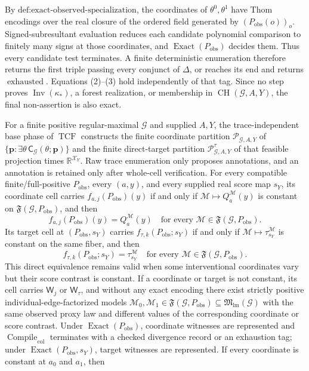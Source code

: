 By \(\text{def:exact-observed-specialization}\), the coordinates of \(\theta^0,\theta^1\) have Thom encodings over the real closure of the ordered field generated by \((P_{\mathrm{obs}}(o))_o\). Signed-subresultant evaluation reduces each candidate polynomial comparison to finitely many signs at those coordinates, and \(\operatorname{Exact}(P_{\mathrm{obs}})\) decides them. Thus every candidate test terminates. A finite deterministic enumeration therefore returns the first triple passing every conjunct of \(\Delta\), or reaches its end and returns \(\operatorname{exhausted}\). Equations (2)--(3) hold independently of that tag. Since no step proves \(\operatorname{Inv}(\kappa_*)\), a forest realization, or membership in \(\operatorname{CH}(\mathcal G,A,Y)\), the final non-assertion is also exact.

For a finite positive regular-maximal \(\mathcal G\) and supplied \(A,Y\), the trace-independent base phase of \(\operatorname{TCF}\) constructs the finite coordinate partition \(\mathscr P_{\mathcal G,A,Y}\) of \(\{\mathbf p:\exists\theta\,\mathsf C_{\mathcal G}(\theta;\mathbf p)\}\) and the finite direct-target partition \(\mathscr P^{\tau}_{\mathcal G,A,Y}\) of that feasible projection times \(\mathbb R^{\mathcal X_Y}\). Raw trace enumeration only proposes annotations, and an annotation is retained only after whole-cell verification. For every compatible finite/full-positive \(P_{\mathrm{obs}}\), every \((a,y)\), and every supplied real score map \(s_Y\), its coordinate cell carries \(f_{a,j}(P_{\mathrm{obs}})(y)\) if and only if \(\mathcal M\mapsto Q_a^{\mathcal M}(y)\) is constant on \(\mathfrak F(\mathcal G,P_{\mathrm{obs}})\), and then
\[
f_{a,j}(P_{\mathrm{obs}})(y)=Q_a^{\mathcal M}(y)
\quad\text{for every }\mathcal M\in\mathfrak F(\mathcal G,P_{\mathrm{obs}}).
\]
Its target cell at \((P_{\mathrm{obs}},s_Y)\) carries \(f_{\tau,k}(P_{\mathrm{obs}};s_Y)\) if and only if \(\mathcal M\mapsto\tau_{s_Y}^{\mathcal M}\) is constant on the same fiber, and then
\[
f_{\tau,k}(P_{\mathrm{obs}};s_Y)=\tau_{s_Y}^{\mathcal M}
\quad\text{for every }\mathcal M\in\mathfrak F(\mathcal G,P_{\mathrm{obs}}).
\]
This direct equivalence remains valid when some interventional coordinates vary but their score contrast is constant. If a coordinate or target is not constant, its cell carries \(\mathsf W_j\) or \(\mathsf W_{\tau}\), and without any exact encoding there exist strictly positive individual-edge-factorized models \(\mathcal M_0,\mathcal M_1\in\mathfrak F(\mathcal G,P_{\mathrm{obs}})\subseteq\mathfrak M_{\mathrm{lm}}(\mathcal G)\) with the same observed proxy law and different values of the corresponding coordinate or score contrast. Under \(\operatorname{Exact}(P_{\mathrm{obs}})\), coordinate witnesses are represented and \(\operatorname{Compile}_{\mathrm{col}}\) terminates with a checked divergence record or an exhaustion tag; under \(\operatorname{Exact}(P_{\mathrm{obs}},s_Y)\), target witnesses are represented. If every coordinate is constant at \(a_0\) and \(a_1\), then
